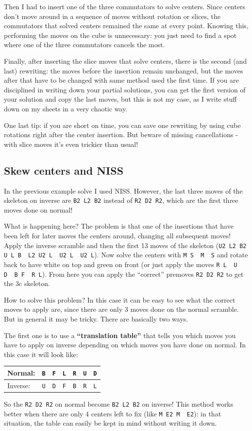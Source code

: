 \documentclass[11pt,a4paper]{book}
\newcommand{\p}{\textquotesingle}
\newcommand{\m}{\texttt}
\newcommand{\ps}{\p\,\,}
\begin{document}
Then I had to insert one of the three commutators to solve centers. Since centers don't move around in a sequence of moves without rotation or slices, the commutators that solved centers remained the same at every point. Knowing this, performing the moves on the cube is unnecessary: you just need to find a spot where one of the three commutators cancels the most.

Finally, after inserting the slice moves that solve centers, there is the second (and last) rewriting: the moves before the insertion remain unchanged, but the moves after that have to be changed with same method used the first time. If you are disciplined in writing down your partial solutions, you can get the first version of your solution and copy the last moves, but this is not my case, as I write stuff down on my sheets in a very chaotic way.

One last tip: if you are short on time, you can save one rewriting by using cube rotations right after the center insertion. But beware of missing cancellations - with slice moves it's even trickier than usual!

\subsection{Skew centers and NISS}
\label{sec:skewNISS}

In the previous example solve I used NISS. However, the last three moves of the skeleton on inverse are \m{B2 L2 B2} instead of \m{R2 D2 R2}, which are the first three moves done on normal!

What is happening here? The problem is that one of the insertions that have been left for later moves the centers around, changing all subsequent moves! Apply the inverse scramble and then the first 13 moves of the skeleton (\m{U2 L2 B2 U L B\ps L2 U2 L\ps U2 L\ps U2 L}). Now solve the centers with \m{M S\ps M\ps S} and rotate back to have white on top and green on front (or just apply the moves \m{R L\ps U D\ps B F\ps R L\p}). From here you can apply the ``correct'' premoves \m{R2 D2 R2} to get the 3c skeleton.

How to solve this problem? In this case it can be easy to see what the correct moves to apply are, since there are only 3 moves done on the normal scramble. But in general it may be tricky. There are basically two ways.

The first one is to use a \textbf{``translation table''} that tells you which moves you have to apply on inverse depending on which moves you have done on normal. In this case it will look like:
\begin{center}
\begin{tabular}{l|c|c|c|c|c|c}
Normal: &  \m{B} & \m{F} & \m{L} & \m{R} & \m{U} & \m{D}\\
\hline
Inverse: & \m{U} & \m{D} & \m{F} & \m{B} & \m{R} & \m{L}
\end{tabular}
\end{center}
So the \m{R2 D2 R2} on normal become \m{B2 L2 B2} on inverse! This method works better when there are only 4 centers left to fix (like \m{M E2 M\ps E2}): in that situation, the table can easily be kept in mind without writing it down.
\end{document}

